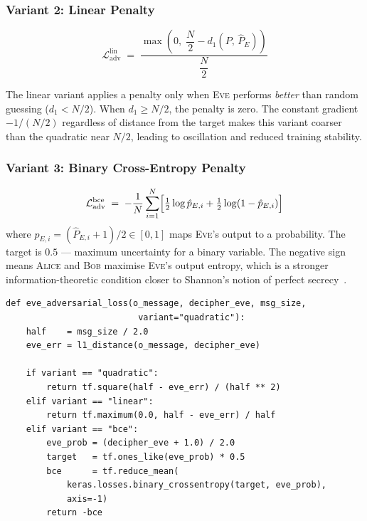 \documentclass[12pt, a4paper]{article}
\newcommand{\alice}{\textsc{Alice}}
\newcommand{\bob}{\textsc{Bob}}
\newcommand{\eve}{\textsc{Eve}}
\begin{document}
\subsubsection*{Variant 2: Linear Penalty}

\begin{equation}
  \mathcal{L}_{\mathrm{adv}}^{\mathrm{lin}}
  \;=\;
  \frac{\max\!\left(0,\;\dfrac{N}{2} - d_1(P,\, \hat{P}_E)\right)}
       {\dfrac{N}{2}}
  \label{eq:adv_linear}
\end{equation}

The linear variant applies a penalty only when \eve{} performs
\emph{better} than random guessing ($d_1 < N/2$). When $d_1 \geq N/2$,
the penalty is zero. The constant gradient $-1/(N/2)$ regardless of
distance from the target makes this variant coarser than the quadratic
near $N/2$, leading to oscillation and reduced training stability.

\subsubsection*{Variant 3: Binary Cross-Entropy Penalty}

\begin{equation}
  \mathcal{L}_{\mathrm{adv}}^{\mathrm{bce}}
  \;=\;
  -\frac{1}{N}\sum_{i=1}^{N}
    \Bigl[
      \tfrac{1}{2}\log \hat{p}_{E,i}
    + \tfrac{1}{2}\log(1 - \hat{p}_{E,i})
    \Bigr]
  \label{eq:adv_bce}
\end{equation}
%
where $\hat{p}_{E,i} = (\hat{P}_{E,i}+1)/2 \in [0,1]$ maps \eve{}'s
output to a probability. The target is $0.5$ --- maximum uncertainty
for a binary variable. The negative sign means \alice{} and \bob{} maximise
\eve{}'s output entropy, which is a stronger information-theoretic
condition closer to Shannon's notion of perfect secrecy~\cite{shannon1949communication}.

\begin{lstlisting}[caption={All three adversarial penalty variants}]
def eve_adversarial_loss(o_message, decipher_eve, msg_size,
                          variant="quadratic"):
    half    = msg_size / 2.0
    eve_err = l1_distance(o_message, decipher_eve)

    if variant == "quadratic":
        return tf.square(half - eve_err) / (half ** 2)
    elif variant == "linear":
        return tf.maximum(0.0, half - eve_err) / half
    elif variant == "bce":
        eve_prob = (decipher_eve + 1.0) / 2.0
        target   = tf.ones_like(eve_prob) * 0.5
        bce      = tf.reduce_mean(
            keras.losses.binary_crossentropy(target, eve_prob),
            axis=-1)
        return -bce
\end{lstlisting}
\end{document}
